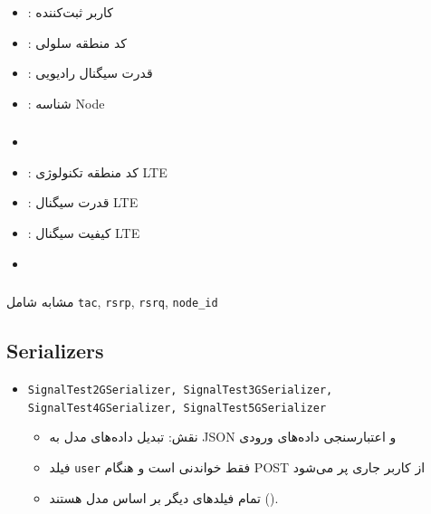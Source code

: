 \documentclass{report}
\begin{document}
\subsubsection{}
\begin{itemize}
    \item \texttt{}: کاربر ثبت‌کننده
    \item \texttt{}: کد منطقه سلولی
    \item \texttt{}: قدرت سیگنال رادیویی
    \item \texttt{}: شناسه Node
\end{itemize}

\subsubsection{}
\begin{itemize}
    \item \texttt{}
    \item \texttt{}: کد منطقه تکنولوژی LTE
    \item \texttt{}: قدرت سیگنال LTE
    \item \texttt{}: کیفیت سیگنال LTE
    \item \texttt{}
\end{itemize}

\subsubsection{}
مشابه  شامل \texttt{tac}, \texttt{rsrp}, \texttt{rsrq}, \texttt{node\_id}

\subsection{Serializers}
\begin{itemize}
    \item \texttt{SignalTest2GSerializer, SignalTest3GSerializer, SignalTest4GSerializer, SignalTest5GSerializer}
    \begin{itemize}
        \item نقش: تبدیل داده‌های مدل به JSON و اعتبارسنجی داده‌های ورودی
        \item فیلد \texttt{user} فقط خواندنی است و هنگام POST از کاربر جاری پر می‌شود
        \item تمام فیلدهای دیگر بر اساس مدل هستند (\texttt{}).
    \end{itemize}
\end{itemize}
\end{document}
